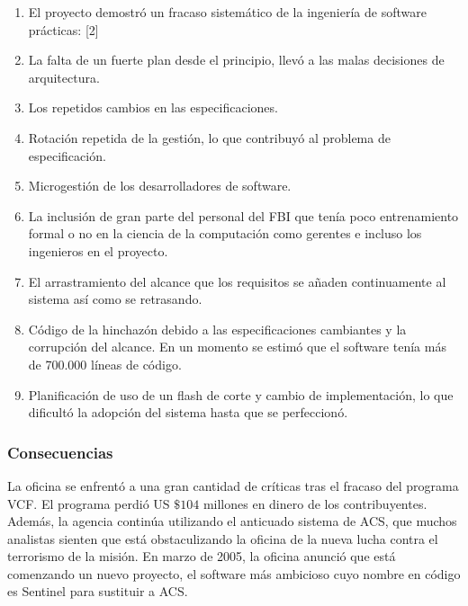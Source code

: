 \documentclass[titlepage,a4paper,twoside]{article}
\theoremstyle{definition}
\numberwithin{algorithm}{section}
\theoremstyle{remark}
\numberwithin{equation}{section}
\begin{document}
    \begin{enumerate}
    	\item El proyecto demostró un fracaso sistemático de la ingeniería de software prácticas: [2]
    	\item La falta de un fuerte plan desde el principio, llevó a las malas decisiones de arquitectura.
    	\item Los repetidos cambios en las especificaciones.
    	\item Rotación repetida de la gestión, lo que contribuyó al problema de especificación.
    	\item Microgestión de los desarrolladores de software.
    	\item La inclusión de gran parte del personal del FBI que tenía poco entrenamiento formal o no en la ciencia de la computación como gerentes e incluso los ingenieros en el proyecto.
    	\item El arrastramiento del alcance que los requisitos se añaden continuamente al sistema así como se retrasando.
    	\item Código de la hinchazón debido a las especificaciones cambiantes y la corrupción del alcance. En un momento se estimó que el software tenía más de 700.000 líneas de código.
    	\item Planificación de uso de un flash de corte y cambio de implementación, lo que dificultó la adopción del sistema hasta que se perfeccionó.
    \end{enumerate}
   
   
    \subsubsection{Consecuencias}
   
   
    La oficina se enfrentó a una gran cantidad de críticas tras el fracaso del programa VCF. El programa perdió US $\$104$ millones en dinero de los contribuyentes. Además, la agencia continúa utilizando el anticuado sistema de ACS, que muchos analistas sienten que está obstaculizando la oficina de la nueva lucha contra el terrorismo de la misión. En marzo de 2005, la oficina anunció que está comenzando un nuevo proyecto, el software más ambicioso cuyo nombre en código es Sentinel para sustituir a ACS.
   
\end{document}
